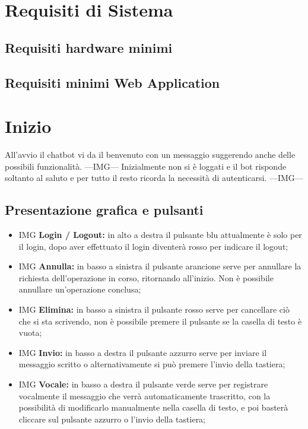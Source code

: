 \section{Requisiti di Sistema}
\subsection{Requisiti hardware minimi}
\subsection{Requisiti minimi Web Application}

\newpage
\section{Inizio}
All'avvio il chatbot vi da il benvenuto con un messaggio suggerendo anche delle possibili funzionalità.
---IMG--- \newline
Inizialmente non si è loggati e il bot risponde soltanto al saluto e per tutto il resto ricorda la necessità di autenticarsi.
---IMG--- \newline
\subsection{Presentazione grafica e pulsanti}
\begin{itemize}
    \item IMG \textbf{Login / Logout:} in alto a destra il pulsante blu attualmente è solo per il login, dopo aver effettuato il login diventerà rosso per indicare il logout;
    \item IMG \textbf{Annulla:} in basso a sinistra il pulsante arancione serve per annullare la richiesta dell'operazione in corso, ritornando all'inizio. Non è possibile annullare un'operazione conclusa;
    \item IMG \textbf{Elimina:} in basso a sinistra il pulsante rosso serve per cancellare ciò che si sta scrivendo, non è possibile premere il pulsante se la casella di testo è vuota;
    \item IMG \textbf{Invio:} in basso a destra il pulsante azzurro serve per inviare il messaggio scritto o alternativamente si può premere l'invio della tastiera;
    \item IMG \textbf{Vocale:} in basso a destra il pulsante verde serve per registrare vocalmente il messaggio che verrà automaticamente trascritto, con la possibilità di modificarlo manualmente nella casella di testo, e poi basterà cliccare sul pulsante azzurro o l'invio della tastiera; 
\end{itemize}
